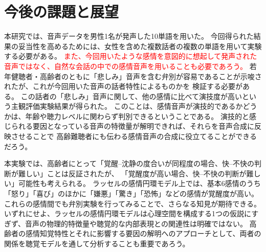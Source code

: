 

%




\section{今後の課題と展望}
\label{sec:Challenges}
本研究では、音声データを男性1名が発声した10単語を用いた。
今回得られた結果の妥当性を高めるためには、女性を含めた複数話者の複数の単語を用いて実験する必要がある。
\textcolor{red}{
  また、今回用いたような感情を意図的に想起して発声された音声ではなく、自然な会話の中での感情音声を用いることも必要であろう。}
若年健聴者・高齢者のともに「悲しみ」音声を含む弁別が容易であることが示唆されたが、これが今回用いた音声の話者特性によるものかを
検証する必要がある。
この話者の「悲しみ」音声に関して、他の感情に比べて演技度が高いという主観評価実験結果が得られた。
このことは、感情音声が演技的であるかどうかは、年齢や聴力レベルに関わらず判別できるということである。
演技的と感じられる要因となっている音声の特徴量が解明できれば、それらを音声合成に反映させることで
高齢難聴者にも伝わる感情音声の合成に役立てることができるだろう。

本実験では、高齢者にとって「覚醒–沈静の度合いが同程度の場合、快–不快の判断が難しい」ことは反証されたが、
「覚醒度が高い場合、快–不快の判断が難しい」可能性も考えられる。
ラッセルの感情円環モデル上では、基本6感情のうち「怒り」「喜び」のほかに「嫌悪」「驚き」「恐怖」などの感情が覚醒度が高い。
これらの感情間でも弁別実験を行ってみることで、さらなる知見が期待できる。
いずれにせよ、ラッセルの感情円環モデルは心理空間を構成する1つの仮説にすぎず、音声の物理的特徴量や聴覚的な内部表現との関連性は明確ではない。
高齢者の感情知覚特性とそれに影響する要因の解明へのアプローチとして、両者の関係を聴覚モデルを通して分析することも重要であろう。



